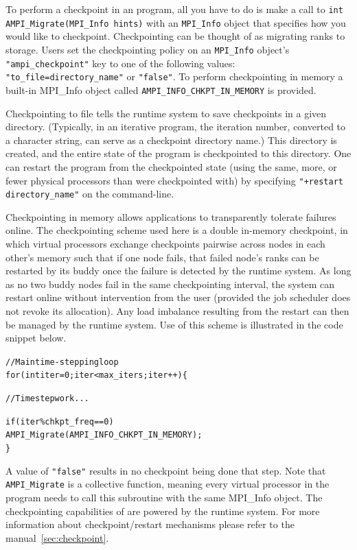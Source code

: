 \documentclass[10pt]{article}
\begin{document}
To perform a checkpoint in an \ampi{} program, all you have to do is make a call
to \texttt{int AMPI\_Migrate(MPI\_Info hints)} with an \texttt{MPI\_Info} object that
specifies how you would like to checkpoint. Checkpointing can be thought of as
migrating \ampi{} ranks to storage. Users set the checkpointing policy
on an \texttt{MPI\_Info} object's \texttt{"ampi\_checkpoint"} key to one of the
following values: \texttt{"to\_file=directory\_name"} or \texttt{"false"}.
To perform checkpointing in memory a built-in MPI\_Info object called
\texttt{AMPI\_INFO\_CHKPT\_IN\_MEMORY} is provided.

Checkpointing to file tells the runtime system to save checkpoints in a given
directory. (Typically, in an iterative program, the iteration number, converted to a
character string, can serve as a checkpoint directory name.) This directory
is created, and the entire state of the program is checkpointed to this directory.
One can restart the program from the checkpointed state (using the same, more, or
fewer physical processors than were checkpointed with) by specifying \texttt{"+restart
directory\_name"} on the command-line.

Checkpointing in memory allows applications to transparently tolerate failures online.
The checkpointing scheme used here is a double in-memory checkpoint, in which
virtual processors exchange checkpoints pairwise across nodes in each other's memory
such that if one node fails, that failed node's \ampi{} ranks can be restarted by its
buddy once the failure is detected by the runtime system. As long as no two buddy
nodes fail in the same checkpointing interval, the system can restart online without
intervention from the user (provided the job scheduler does not revoke its allocation).
Any load imbalance resulting from the restart can then be managed by the runtime system.
Use of this scheme is illustrated in the code snippet below.

\begin{alltt}
// Main time-stepping loop
for (int iter=0; iter < max_iters; iter++) \{

  // Time step work ...

  if (iter \% chkpt_freq == 0)
    AMPI_Migrate(AMPI_INFO_CHKPT_IN_MEMORY);
\}
\end{alltt}

A value of \texttt{"false"} results in no checkpoint being done that step.
Note that \texttt{AMPI\_Migrate} is a collective function, meaning every
virtual processor in the program needs to call this subroutine with the
same MPI\_Info object. The checkpointing capabilities of \ampi{} are powered by
the \charmpp{} runtime system. For more information about checkpoint/restart
mechanisms please refer to the \charmpp{} manual~\ref{sec:checkpoint}.
\end{document}
